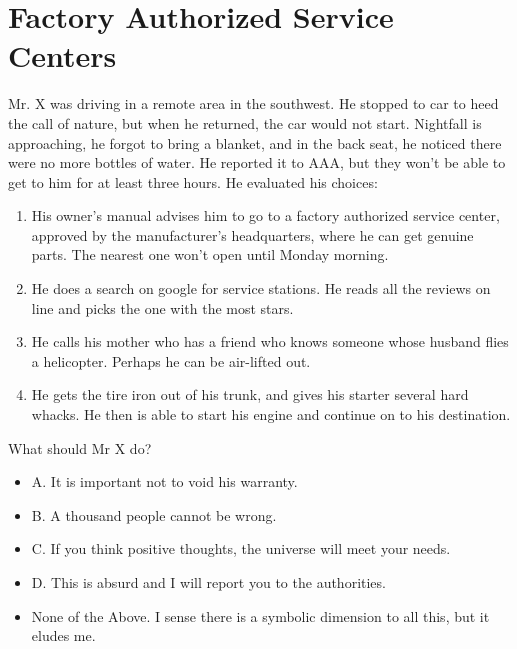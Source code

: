 \section{Factory Authorized Service Centers}

Mr. X was driving in a remote area in the southwest. He stopped to car to heed the call of nature, but when he returned, the car would not start. Nightfall is approaching, he forgot to bring a blanket, and in the back seat, he noticed there were no more bottles of water. He reported it to AAA, but they won't be able to get to him for at least three hours. He evaluated his choices:

\begin{enumerate}

\def\labelenumi{\Alph{enumi}.}


\item His owner's manual advises him to go to a factory authorized service center, approved by the manufacturer's headquarters, where he can get genuine parts. The nearest one won't open until Monday morning.

\item He does a search on google for service stations. He reads all the reviews on line and picks the one with the most stars.

\item He calls his mother who has a friend who knows someone whose husband flies a helicopter. Perhaps he can be air-lifted out.

\item He gets the tire iron out of his trunk, and gives his starter several hard whacks. He then is able to start his engine and continue on to his destination.
\end{enumerate}


What should Mr X do?

\begin{itemize}


\item A. It is important not to void his warranty.

\item B. A thousand people cannot be wrong.

\item C. If you think positive thoughts, the universe will meet your needs.

\item D. This is absurd and I will report you to the authorities.

\item None of the Above. I sense there is a symbolic dimension to all this, but it eludes me.
\end{itemize}

